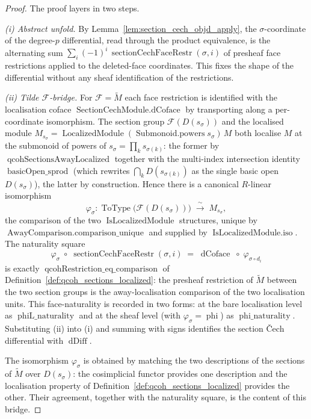\begin{proof}
  The proof layers in two steps.

  \emph{(i) Abstract unfold.} By Lemma~\ref{lem:section_cech_objd_apply}, the
  \(\sigma\)-coordinate of the degree-\(p\) differential, read through the product
  equivalence, is the alternating sum
  \(\sum_{i} (-1)^i\, \operatorname{sectionCechFaceRestr}(\sigma, i)\) of presheaf face
  restrictions applied to the deleted-face coordinates. This fixes the shape of the
  differential without any sheaf identification of the restrictions.

  \emph{(ii) Tilde \(\mathcal{F}\)-bridge.} For \(\mathcal{F} = \widetilde{M}\) each
  face restriction is identified with the localisation coface
  \(\operatorname{SectionCechModule.dCoface}\) by transporting along a per-coordinate
  isomorphism. The section group
  \(\mathcal{F}(D(s_\sigma))\) and the localised module
  \(M_{s_\sigma} = \operatorname{LocalizedModule}(\operatorname{Submonoid.powers}
  s_\sigma)\, M\) both localise \(M\) at the submonoid of powers of
  \(s_\sigma = \prod_k s_{\sigma(k)}\): the former by
  \(\operatorname{qcohSectionsAwayLocalized}\) together with the multi-index
  intersection identity \(\operatorname{basicOpen\_sprod}\) (which rewrites
  \(\bigcap_k D(s_{\sigma(k)})\) as the single basic open \(D(s_\sigma)\)), the latter
  by construction. Hence there is a canonical \(R\)-linear isomorphism
  \[
    \varphi_\sigma :
      \operatorname{ToType}\bigl(\mathcal{F}(D(s_\sigma))\bigr)
      \;\xrightarrow{\;\sim\;}\;
      M_{s_\sigma},
  \]
  the comparison of the two \(\operatorname{IsLocalizedModule}\) structures, unique by
  \(\operatorname{AwayComparison.comparison\_unique}\) and supplied by
  \(\operatorname{IsLocalizedModule.iso}\). The naturality square
  \[
    \varphi_\sigma \;\circ\; \operatorname{sectionCechFaceRestr}(\sigma, i)
      \;=\;
      \operatorname{dCoface} \;\circ\; \varphi_{\sigma \circ d_i}
  \]
  is exactly \(\operatorname{qcohRestriction\_eq\_comparison}\) of
  Definition~\ref{def:qcoh_sections_localized}: the presheaf restriction of
  \(\widetilde{M}\) between the two section groups is the away-localisation comparison
  of the two localisation units. This face-naturality is recorded in two forms: at the
  bare localisation level as \(\operatorname{phiL\_naturality}\) and at the sheaf level
  (with \(\varphi_\sigma = \operatorname{phi}\)) as \(\operatorname{phi\_naturality}\).
  Substituting (ii) into (i) and summing with signs
  identifies the section {\v C}ech differential with \(\operatorname{dDiff}\).

  The isomorphism \(\varphi_\sigma\) is obtained by matching the two descriptions of
  the sections of \(\widetilde{M}\) over \(D(s_\sigma)\): the cosimplicial functor
  provides one description and the localisation property of
  Definition~\ref{def:qcoh_sections_localized} provides the other. Their agreement,
  together with the naturality square, is the content of this bridge.
\end{proof}

